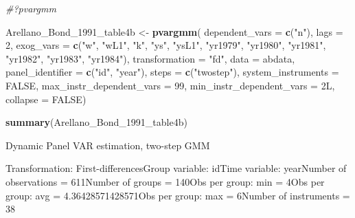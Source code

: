 \documentclass[
]{book}
\newenvironment{Shaded}{\begin{snugshade}}{\end{snugshade}}
\newcommand{\AttributeTok}[1]{\textcolor[rgb]{0.13,0.29,0.53}{#1}}
\newcommand{\CommentTok}[1]{\textcolor[rgb]{0.56,0.35,0.01}{\textit{#1}}}
\newcommand{\ConstantTok}[1]{\textcolor[rgb]{0.56,0.35,0.01}{#1}}
\newcommand{\DecValTok}[1]{\textcolor[rgb]{0.00,0.00,0.81}{#1}}
\newcommand{\FunctionTok}[1]{\textcolor[rgb]{0.13,0.29,0.53}{\textbf{#1}}}
\newcommand{\NormalTok}[1]{#1}
\newcommand{\OtherTok}[1]{\textcolor[rgb]{0.56,0.35,0.01}{#1}}
\newcommand{\StringTok}[1]{\textcolor[rgb]{0.31,0.60,0.02}{#1}}
\begin{document}
\begin{Shaded}
\begin{Highlighting}[]
\CommentTok{\#?pvargmm}

\NormalTok{Arellano\_Bond\_1991\_table4b }\OtherTok{\textless{}{-}} \FunctionTok{pvargmm}\NormalTok{( }\AttributeTok{dependent\_vars =} \FunctionTok{c}\NormalTok{(}\StringTok{"n"}\NormalTok{),}
                                       \AttributeTok{lags =} \DecValTok{2}\NormalTok{, }
                                       \AttributeTok{exog\_vars =} \FunctionTok{c}\NormalTok{(}\StringTok{"w"}\NormalTok{, }\StringTok{"wL1"}\NormalTok{, }\StringTok{"k"}\NormalTok{, }\StringTok{"ys"}\NormalTok{, }\StringTok{"ysL1"}\NormalTok{, }\StringTok{"yr1979"}\NormalTok{, }\StringTok{"yr1980"}\NormalTok{, }\StringTok{"yr1981"}\NormalTok{, }\StringTok{"yr1982"}\NormalTok{,}
                                                      \StringTok{"yr1983"}\NormalTok{, }\StringTok{"yr1984"}\NormalTok{),}
                                       \AttributeTok{transformation =} \StringTok{"fd"}\NormalTok{, }\AttributeTok{data =}\NormalTok{ abdata,  }\AttributeTok{panel\_identifier =} \FunctionTok{c}\NormalTok{(}\StringTok{"id"}\NormalTok{, }\StringTok{"year"}\NormalTok{),}
                                       \AttributeTok{steps =} \FunctionTok{c}\NormalTok{(}\StringTok{"twostep"}\NormalTok{),}
                                       \AttributeTok{system\_instruments =} \ConstantTok{FALSE}\NormalTok{,}
                                       \AttributeTok{max\_instr\_dependent\_vars =} \DecValTok{99}\NormalTok{,}
                                       \AttributeTok{min\_instr\_dependent\_vars =}\NormalTok{ 2L,}
                                       \AttributeTok{collapse =} \ConstantTok{FALSE}\NormalTok{)}
\end{Highlighting}
\end{Shaded}

\begin{Shaded}
\begin{Highlighting}[]
\FunctionTok{summary}\NormalTok{(Arellano\_Bond\_1991\_table4b)}
\end{Highlighting}
\end{Shaded}

Dynamic Panel VAR estimation, two-step GMM

Transformation: First-differencesGroup variable: idTime variable: yearNumber of observations = 611Number of groups = 140Obs per group: min = 4Obs per group: avg = 4.36428571428571Obs per group: max = 6Number of instruments = 38
\end{document}
